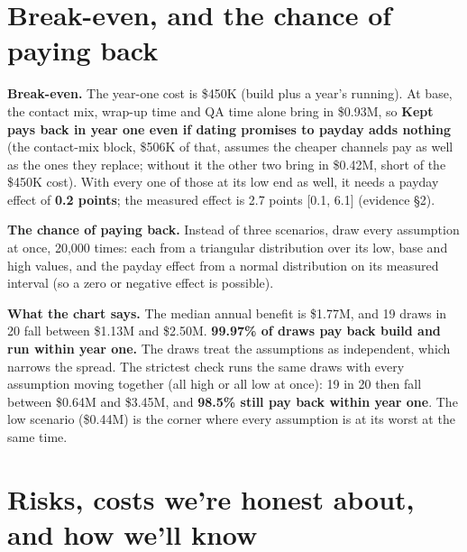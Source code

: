 \documentclass[11pt]{article}
\begin{document}
\section{Break-even, and the chance of paying back}

\textbf{Break-even.} The year-one cost is \$450K (build plus a year's running). At base, the contact mix, wrap-up time and
QA time alone bring in \$0.93M, so \textbf{Kept pays back in year one even if dating promises to payday adds nothing} (the contact-mix block, \$506K of that, assumes the cheaper channels pay as well as the ones they replace; without it the other two bring in \$0.42M, short of the \$450K cost).
With every one of those at its low end as well, it needs a payday effect of \textbf{0.2 points}; the measured effect is
2.7 points [0.1, 6.1] (evidence §2).

\textbf{The chance of paying back.} Instead of three scenarios, draw every assumption at once, 20,000 times: each from a
triangular distribution over its low, base and high values, and the payday effect from a normal distribution on its
measured interval (so a zero or negative effect is possible).


\textbf{What the chart says.} The median annual benefit is \$1.77M, and 19 draws in 20 fall between \$1.13M and
\$2.50M. \textbf{99.97\% of draws pay back build and run within year one.} The draws treat the assumptions as independent,
which narrows the spread. The strictest check runs the same draws with every assumption moving together (all high or all
low at once): 19 in 20 then fall between \$0.64M and \$3.45M, and \textbf{98.5\% still pay back within year one}. The
low scenario (\$0.44M) is the corner where every assumption is at its worst at the same time.

\section{Risks, costs we're honest about, and how we'll know}
\end{document}
